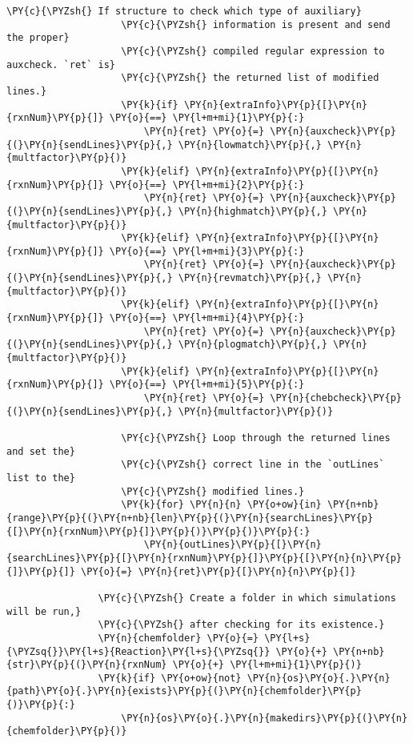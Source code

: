 \begin{Verbatim}[commandchars=\\\{\}]
                    \PY{c}{\PYZsh{} If structure to check which type of auxiliary}
                    \PY{c}{\PYZsh{} information is present and send the proper}
                    \PY{c}{\PYZsh{} compiled regular expression to auxcheck. `ret` is}
                    \PY{c}{\PYZsh{} the returned list of modified lines.}
                    \PY{k}{if} \PY{n}{extraInfo}\PY{p}{[}\PY{n}{rxnNum}\PY{p}{]} \PY{o}{==} \PY{l+m+mi}{1}\PY{p}{:}
                        \PY{n}{ret} \PY{o}{=} \PY{n}{auxcheck}\PY{p}{(}\PY{n}{sendLines}\PY{p}{,} \PY{n}{lowmatch}\PY{p}{,} \PY{n}{multfactor}\PY{p}{)}
                    \PY{k}{elif} \PY{n}{extraInfo}\PY{p}{[}\PY{n}{rxnNum}\PY{p}{]} \PY{o}{==} \PY{l+m+mi}{2}\PY{p}{:}
                        \PY{n}{ret} \PY{o}{=} \PY{n}{auxcheck}\PY{p}{(}\PY{n}{sendLines}\PY{p}{,} \PY{n}{highmatch}\PY{p}{,} \PY{n}{multfactor}\PY{p}{)}
                    \PY{k}{elif} \PY{n}{extraInfo}\PY{p}{[}\PY{n}{rxnNum}\PY{p}{]} \PY{o}{==} \PY{l+m+mi}{3}\PY{p}{:}
                        \PY{n}{ret} \PY{o}{=} \PY{n}{auxcheck}\PY{p}{(}\PY{n}{sendLines}\PY{p}{,} \PY{n}{revmatch}\PY{p}{,} \PY{n}{multfactor}\PY{p}{)}
                    \PY{k}{elif} \PY{n}{extraInfo}\PY{p}{[}\PY{n}{rxnNum}\PY{p}{]} \PY{o}{==} \PY{l+m+mi}{4}\PY{p}{:}
                        \PY{n}{ret} \PY{o}{=} \PY{n}{auxcheck}\PY{p}{(}\PY{n}{sendLines}\PY{p}{,} \PY{n}{plogmatch}\PY{p}{,} \PY{n}{multfactor}\PY{p}{)}
                    \PY{k}{elif} \PY{n}{extraInfo}\PY{p}{[}\PY{n}{rxnNum}\PY{p}{]} \PY{o}{==} \PY{l+m+mi}{5}\PY{p}{:}
                        \PY{n}{ret} \PY{o}{=} \PY{n}{chebcheck}\PY{p}{(}\PY{n}{sendLines}\PY{p}{,} \PY{n}{multfactor}\PY{p}{)}

                    \PY{c}{\PYZsh{} Loop through the returned lines and set the}
                    \PY{c}{\PYZsh{} correct line in the `outLines` list to the}
                    \PY{c}{\PYZsh{} modified lines.}
                    \PY{k}{for} \PY{n}{n} \PY{o+ow}{in} \PY{n+nb}{range}\PY{p}{(}\PY{n+nb}{len}\PY{p}{(}\PY{n}{searchLines}\PY{p}{[}\PY{n}{rxnNum}\PY{p}{]}\PY{p}{)}\PY{p}{)}\PY{p}{:}
                        \PY{n}{outLines}\PY{p}{[}\PY{n}{searchLines}\PY{p}{[}\PY{n}{rxnNum}\PY{p}{]}\PY{p}{[}\PY{n}{n}\PY{p}{]}\PY{p}{]} \PY{o}{=} \PY{n}{ret}\PY{p}{[}\PY{n}{n}\PY{p}{]}

                \PY{c}{\PYZsh{} Create a folder in which simulations will be run,}
                \PY{c}{\PYZsh{} after checking for its existence.}
                \PY{n}{chemfolder} \PY{o}{=} \PY{l+s}{\PYZsq{}}\PY{l+s}{Reaction}\PY{l+s}{\PYZsq{}} \PY{o}{+} \PY{n+nb}{str}\PY{p}{(}\PY{n}{rxnNum} \PY{o}{+} \PY{l+m+mi}{1}\PY{p}{)}
                \PY{k}{if} \PY{o+ow}{not} \PY{n}{os}\PY{o}{.}\PY{n}{path}\PY{o}{.}\PY{n}{exists}\PY{p}{(}\PY{n}{chemfolder}\PY{p}{)}\PY{p}{:}
                    \PY{n}{os}\PY{o}{.}\PY{n}{makedirs}\PY{p}{(}\PY{n}{chemfolder}\PY{p}{)}


\end{Verbatim}
